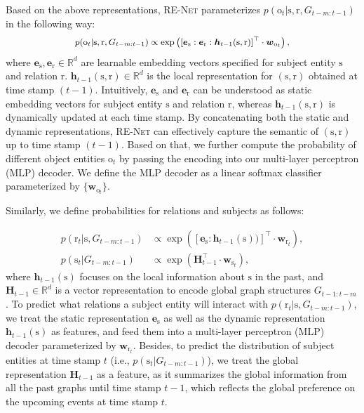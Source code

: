 \documentclass[11pt,a4paper]{article}
\newcommand{\meng}[1]{{{\textcolor{orange}{[Meng: #1]}}}}
\newcommand{\bH}{\boldsymbol{H}}
\newcommand{\bh}{\boldsymbol{h}}
\newcommand{\bw}{\boldsymbol{w}}
\newcommand{\mbR}{\mathbb{R}}
\newcommand{\prob}{p}
\newcommand{\calE}{G}
\newcommand{\method}{\textsc{RE-Net}\xspace}
\newcommand{\teN}{\text{N}}
\newcommand{\bs}{\mathrm{s}}
\newcommand{\br}{\mathrm{r}}
\newcommand{\bo}{\mathrm{o}}
\newcommand{\es}{\boldsymbol{e}_{\mathrm{s}}}
\newcommand{\er}{\boldsymbol{e}_{\mathrm{r}}}
\renewcommand{\bh}{\boldsymbol{h}}
\begin{document}
Based on the above representations, \method parameterizes $\prob(\bo_t| \allowbreak \bs,\br,\calE_{t-m:t-1})$ in the following way:
\begin{equation}
\label{eq:prob}
	\small \prob( \bo_{t}|\bs,\br,\calE_{t-m:t-1}) \propto \exp \left([\es:\er:\bh_{t-1}(\bs, \br)]^\top \cdot  \bw_{\bo_{t}}\right),
\end{equation}
where $\es, \er \in \mbR^d$ are learnable embedding vectors specified for subject entity $\bs$ and relation $\br$. 
$\bh_{t-1}(\bs,\br)\in \mbR^d$ is the local representation for $(\bs,\br)$ obtained at time stamp $(t-1)$. Intuitively, $\es$ and $\er$ can be understood as static embedding vectors for subject entity $\bs$ and relation $\br$, whereas $\bh_{t-1}(\bs,\br)$ is dynamically updated at each time stamp. By concatenating both the static and dynamic representations, \method can effectively capture the semantic of $(\bs,\br)$ up to time stamp $(t-1)$. Based on that, we further compute the probability of different object entities $\bo_{t}$ by passing the encoding into our multi-layer perceptron (MLP) decoder.
We define the MLP decoder as a linear softmax classifier parameterized by $\{\bw_{\bo_{t}}\}$.



Similarly, we define probabilities for relations and subjects as follows:

\small
\begin{align}
\label{eq:prob2}
	\prob(\br_{t}|\bs,\calE_{t-m:t-1})&\propto \exp \left([\es:\bh_{t-1}(\bs))]^\top \cdot \bw_{\br_{t}} \right),\\
	\label{eq:prob3}
	\prob(\bs_{t}|\calE_{t-m:t-1})& \propto \exp \left( \bH_{t-1}^\top \cdot \bw_{\bs_{t}} \right),
\end{align}
\normalsize
where $\bh_{t-1}(\bs)$ focuses on the local information about $\bs$ in the past, and $\bH_{t-1} \in \mbR^d$ is a vector representation to encode global graph structures $\calE_{t-1:t-m}$. To predict what relations a subject entity will interact with  $\prob(\br_{t}|\bs,\calE_{t-m:t-1})$, we treat the static representation $\es$ as well as the dynamic representation $\bh_{t-1}(\bs)$ as features, and feed them into a multi-layer perceptron (MLP) decoder parameterized by $\bw_{\br_{t}}$. Besides, to predict the distribution of subject entities at time stamp $t$ (i.e., $\prob(\bs_{t}|\calE_{t-m:t-1})$), we treat the global representation $\bH_{t-1}$ as a feature, as it summarizes the global information from all the past graphs until time stamp $t-1$, which reflects the global preference on the upcoming events at time stamp $t$.
\end{document}
